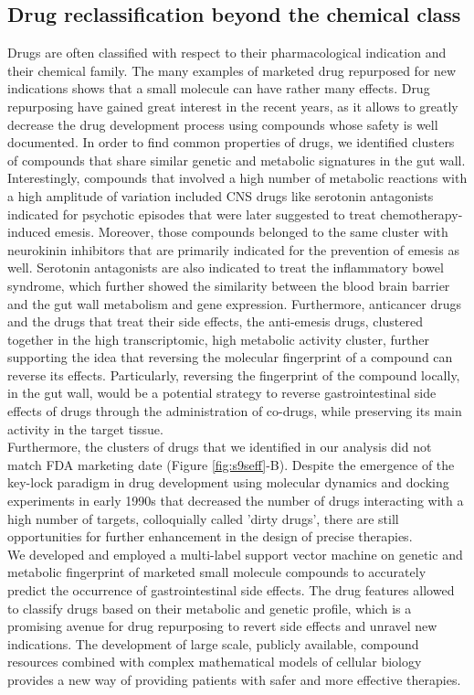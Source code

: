 \subsection{Drug reclassification beyond the chemical class}
Drugs are often classified with respect to their pharmacological indication and their chemical family. The many examples of marketed drug repurposed for new indications \cite{li2015survey} shows that a small molecule can have rather many effects. Drug repurposing have gained great interest in the recent years, as it allows to greatly decrease the drug development process using compounds whose safety is well documented.  
In order to find common properties of drugs, we identified clusters of compounds that share similar genetic and metabolic signatures in the gut wall. Interestingly, compounds that involved a high number of metabolic reactions with a high amplitude of variation included CNS drugs like serotonin antagonists indicated for psychotic episodes that were later suggested to treat chemotherapy-induced emesis. Moreover, those compounds belonged to the same cluster with neurokinin inhibitors that are primarily indicated for the prevention of emesis as well. Serotonin antagonists are also indicated to treat the inflammatory bowel syndrome, which further showed the similarity between the blood brain barrier and the gut wall metabolism and gene expression. Furthermore, anticancer drugs and the drugs that treat their side effects, the anti-emesis drugs, clustered together in the high transcriptomic, high metabolic activity cluster, further supporting the idea that reversing the molecular fingerprint of a compound can reverse its effects. Particularly, reversing the fingerprint of the compound locally, in the gut wall, would be a potential strategy to reverse gastrointestinal side effects of drugs through the administration of co-drugs, while preserving its main activity in the target tissue.\\
Furthermore, the clusters of drugs that we identified in our analysis did not match FDA marketing date (Figure \ref{fig:s9seff}-B). Despite the emergence of the key-lock paradigm \cite{medina2013shifting} in drug development using molecular dynamics and docking experiments in early 1990s that decreased the number of drugs interacting with a high number of targets, colloquially  called 'dirty drugs', there are still opportunities for further enhancement in the design of precise therapies. \\
We developed and employed a multi-label support vector machine on genetic and metabolic fingerprint of marketed small molecule compounds to accurately predict the occurrence of gastrointestinal side effects. The drug features allowed to classify drugs based on their metabolic and genetic profile, which is a promising avenue for drug repurposing to revert side effects and unravel new indications. The development of large scale, publicly available, compound resources combined with complex mathematical models of cellular biology provides a new way of providing patients with safer and more effective therapies.
